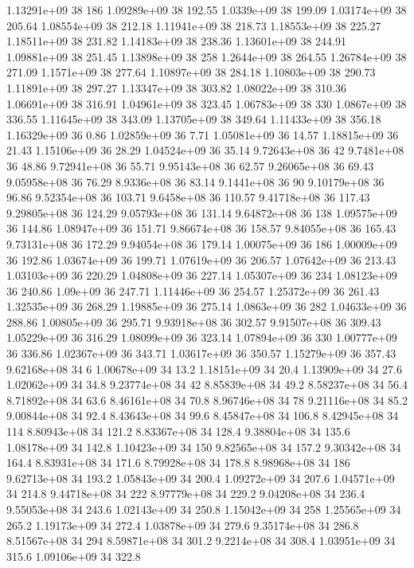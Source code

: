 1.13291e+09 38 186
1.09289e+09 38 192.55
1.0339e+09 38 199.09
1.03174e+09 38 205.64
1.08554e+09 38 212.18
1.11941e+09 38 218.73
1.18553e+09 38 225.27
1.18511e+09 38 231.82
1.14183e+09 38 238.36
1.13601e+09 38 244.91
1.09881e+09 38 251.45
1.13898e+09 38 258
1.2644e+09 38 264.55
1.26784e+09 38 271.09
1.1571e+09 38 277.64
1.10897e+09 38 284.18
1.10803e+09 38 290.73
1.11891e+09 38 297.27
1.13347e+09 38 303.82
1.08022e+09 38 310.36
1.06691e+09 38 316.91
1.04961e+09 38 323.45
1.06783e+09 38 330
1.0867e+09 38 336.55
1.11645e+09 38 343.09
1.13705e+09 38 349.64
1.11433e+09 38 356.18
1.16329e+09 36 0.86
1.02859e+09 36 7.71
1.05081e+09 36 14.57
1.18815e+09 36 21.43
1.15106e+09 36 28.29
1.04524e+09 36 35.14
9.72643e+08 36 42
9.7481e+08 36 48.86
9.72941e+08 36 55.71
9.95143e+08 36 62.57
9.26065e+08 36 69.43
9.05958e+08 36 76.29
8.9336e+08 36 83.14
9.1441e+08 36 90
9.10179e+08 36 96.86
9.52354e+08 36 103.71
9.6458e+08 36 110.57
9.41718e+08 36 117.43
9.29805e+08 36 124.29
9.05793e+08 36 131.14
9.64872e+08 36 138
1.09575e+09 36 144.86
1.08947e+09 36 151.71
9.86674e+08 36 158.57
9.84055e+08 36 165.43
9.73131e+08 36 172.29
9.94054e+08 36 179.14
1.00075e+09 36 186
1.00009e+09 36 192.86
1.03674e+09 36 199.71
1.07619e+09 36 206.57
1.07642e+09 36 213.43
1.03103e+09 36 220.29
1.04808e+09 36 227.14
1.05307e+09 36 234
1.08123e+09 36 240.86
1.09e+09 36 247.71
1.11446e+09 36 254.57
1.25372e+09 36 261.43
1.32535e+09 36 268.29
1.19885e+09 36 275.14
1.0863e+09 36 282
1.04633e+09 36 288.86
1.00805e+09 36 295.71
9.93918e+08 36 302.57
9.91507e+08 36 309.43
1.05229e+09 36 316.29
1.08099e+09 36 323.14
1.07894e+09 36 330
1.00777e+09 36 336.86
1.02367e+09 36 343.71
1.03617e+09 36 350.57
1.15279e+09 36 357.43
9.62168e+08 34 6
1.00678e+09 34 13.2
1.18151e+09 34 20.4
1.13909e+09 34 27.6
1.02062e+09 34 34.8
9.23774e+08 34 42
8.85839e+08 34 49.2
8.58237e+08 34 56.4
8.71892e+08 34 63.6
8.46161e+08 34 70.8
8.96746e+08 34 78
9.21116e+08 34 85.2
9.00844e+08 34 92.4
8.43643e+08 34 99.6
8.45847e+08 34 106.8
8.42945e+08 34 114
8.80943e+08 34 121.2
8.83367e+08 34 128.4
9.38804e+08 34 135.6
1.08178e+09 34 142.8
1.10423e+09 34 150
9.82565e+08 34 157.2
9.30342e+08 34 164.4
8.83931e+08 34 171.6
8.79928e+08 34 178.8
8.98968e+08 34 186
9.62713e+08 34 193.2
1.05843e+09 34 200.4
1.09272e+09 34 207.6
1.04571e+09 34 214.8
9.44718e+08 34 222
8.97779e+08 34 229.2
9.04208e+08 34 236.4
9.55053e+08 34 243.6
1.02143e+09 34 250.8
1.15042e+09 34 258
1.25565e+09 34 265.2
1.19173e+09 34 272.4
1.03878e+09 34 279.6
9.35174e+08 34 286.8
8.51567e+08 34 294
8.59871e+08 34 301.2
9.2214e+08 34 308.4
1.03951e+09 34 315.6
1.09106e+09 34 322.8
